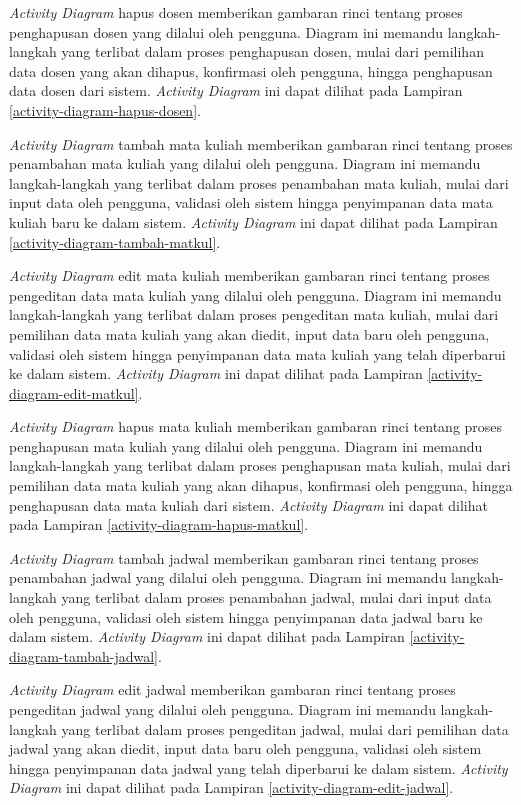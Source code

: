 \textit{Activity Diagram} hapus dosen memberikan gambaran rinci tentang proses penghapusan dosen yang dilalui oleh pengguna. Diagram ini memandu langkah-langkah yang terlibat dalam proses penghapusan dosen, mulai dari pemilihan data dosen yang akan dihapus, konfirmasi oleh pengguna, hingga penghapusan data dosen dari sistem. \textit{Activity Diagram} ini dapat dilihat pada Lampiran \ref{activity-diagram-hapus-dosen}.


\textit{Activity Diagram} tambah mata kuliah memberikan gambaran rinci tentang proses penambahan mata kuliah yang dilalui oleh pengguna. Diagram ini memandu langkah-langkah yang terlibat dalam proses penambahan mata kuliah, mulai dari input data oleh pengguna, validasi oleh sistem hingga penyimpanan data mata kuliah baru ke dalam sistem. \textit{Activity Diagram} ini dapat dilihat pada Lampiran \ref{activity-diagram-tambah-matkul}.


\textit{Activity Diagram} edit mata kuliah memberikan gambaran rinci tentang proses pengeditan data mata kuliah yang dilalui oleh pengguna. Diagram ini memandu langkah-langkah yang terlibat dalam proses pengeditan mata kuliah, mulai dari pemilihan data mata kuliah yang akan diedit, input data baru oleh pengguna, validasi oleh sistem hingga penyimpanan data mata kuliah yang telah diperbarui ke dalam sistem. \textit{Activity Diagram} ini dapat dilihat pada Lampiran \ref{activity-diagram-edit-matkul}.


\textit{Activity Diagram} hapus mata kuliah memberikan gambaran rinci tentang proses penghapusan mata kuliah yang dilalui oleh pengguna. Diagram ini memandu langkah-langkah yang terlibat dalam proses penghapusan mata kuliah, mulai dari pemilihan data mata kuliah yang akan dihapus, konfirmasi oleh pengguna, hingga penghapusan data mata kuliah dari sistem. \textit{Activity Diagram} ini dapat dilihat pada Lampiran \ref{activity-diagram-hapus-matkul}.


\textit{Activity Diagram} tambah jadwal memberikan gambaran rinci tentang proses penambahan jadwal yang dilalui oleh pengguna. Diagram ini memandu langkah-langkah yang terlibat dalam proses penambahan jadwal, mulai dari input data oleh pengguna, validasi oleh sistem hingga penyimpanan data jadwal baru ke dalam sistem. \textit{Activity Diagram} ini dapat dilihat pada Lampiran \ref{activity-diagram-tambah-jadwal}.


\textit{Activity Diagram} edit jadwal memberikan gambaran rinci tentang proses pengeditan jadwal yang dilalui oleh pengguna. Diagram ini memandu langkah-langkah yang terlibat dalam proses pengeditan jadwal, mulai dari pemilihan data jadwal yang akan diedit, input data baru oleh pengguna, validasi oleh sistem hingga penyimpanan data jadwal yang telah diperbarui ke dalam sistem. \textit{Activity Diagram} ini dapat dilihat pada Lampiran \ref{activity-diagram-edit-jadwal}.


